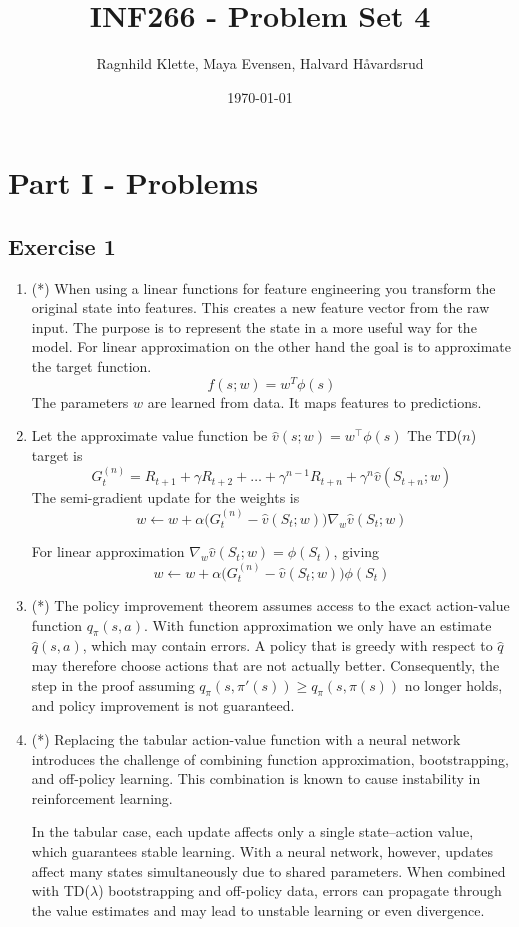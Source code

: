 \documentclass{article}
\title{INF266 - Problem Set 4}
\author{Ragnhild Klette, Maya Evensen, Halvard Håvardsrud}
\date{\today}
\begin{document}
\maketitle

\section*{Part I - Problems}
\subsection*{Exercise 1}
\begin{enumerate}
    \item (*) When using a linear functions for feature engineering you transform the original state into features. This creates a new feature vector from the raw input. The purpose is to represent the state in a more useful way for the model.
    For linear approximation on the other hand the goal is to approximate the target function.
    \[f(s;w) = w^T\phi(s)\]
    The parameters $w$ are learned from data. It maps features to predictions.
   
    \item Let the approximate value function be $\hat{v}(s;w)=w^\top \phi(s)$
    The TD($n$) target is
    \[ G_t^{(n)} = R_{t+1} + \gamma R_{t+2} + \dots + \gamma^{n-1}R_{t+n} + \gamma^n \hat{v}(S_{t+n};w)\]
    The semi-gradient update for the weights is
    \[w \leftarrow w + \alpha \big(G_t^{(n)} - \hat{v}(S_t;w)\big)\nabla_w \hat{v}(S_t;w)\]

    For linear approximation $\nabla_w \hat{v}(S_t;w)=\phi(S_t)$, giving
    \[w \leftarrow w + \alpha \big(G_t^{(n)} - \hat{v}(S_t;w)\big)\phi(S_t)\]

    \item (*) The policy improvement theorem assumes access to the exact action-value function $q_\pi(s,a)$. With function approximation we only have an estimate $\hat{q}(s,a)$, which may contain errors. A policy that is greedy with respect to $\hat{q}$ may therefore choose actions that are not actually better. Consequently, the step in the proof assuming $q_\pi(s,\pi'(s)) \geq q_\pi(s,\pi(s))$ no longer holds, and policy improvement is not guaranteed.

    \item (*) Replacing the tabular action-value function with a neural network introduces the challenge of combining function approximation, bootstrapping, and off-policy learning. This combination is known to cause instability in reinforcement learning. 

    In the tabular case, each update affects only a single state–action value, which guarantees stable learning. With a neural network, however, updates affect many states simultaneously due to shared parameters. When combined with TD($\lambda$) bootstrapping and off-policy data, errors can propagate through the value estimates and may lead to unstable learning or even divergence. 
    
\end{enumerate}
\end{document}
